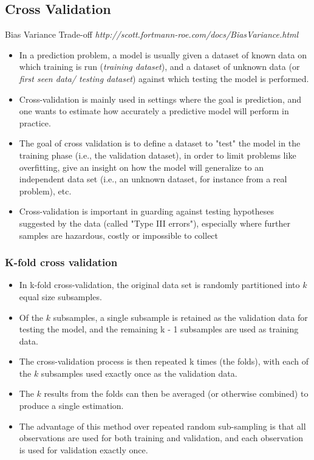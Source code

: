 \documentclass[caret-main.tex]{subfiles}
\begin{document}
\subsection{Cross Validation}
Bias Variance Trade-off \textit{http://scott.fortmann-roe.com/docs/BiasVariance.html}
\begin{itemize}
\item In a prediction problem, a model is usually given a dataset of known data 
on which training is run (\textit{training dataset}), and a dataset of unknown data (or \textit{first seen data/ testing dataset}) against which testing the model is performed.
\item Cross-validation is mainly used in settings where the goal is prediction, and one wants to estimate how accurately a predictive model will perform in practice. 
\item The goal of cross validation is to define a dataset to "test" the model in the training phase (i.e., the validation dataset), in order to limit problems like overfitting, give an insight on how the model will generalize to an independent data set (i.e., an unknown dataset, for instance from a real problem), etc.
\item Cross-validation is important in guarding against testing hypotheses suggested by the data (called "Type III errors"), especially where further samples 
are hazardous, costly or impossible to collect 
\end{itemize}
\subsubsection{K-fold cross validation}
\begin{itemize}
\item In k-fold cross-validation, the original data set is randomly partitioned into $k$ equal size subsamples. 
\item Of the $k$ subsamples, a single subsample is retained as the validation data for testing the model, and the remaining k - 1 subsamples are used as training data. 
\item The cross-validation process is then repeated k times (the folds), with each of the $k$ subsamples used exactly once as the validation data. \item The $k$ results from the folds can then be averaged (or otherwise combined) to produce a single estimation.
\item The advantage of this method over repeated random sub-sampling is that all observations are used for both training and validation, and each observation is used for validation exactly once. 
\end{itemize}
\end{document}
